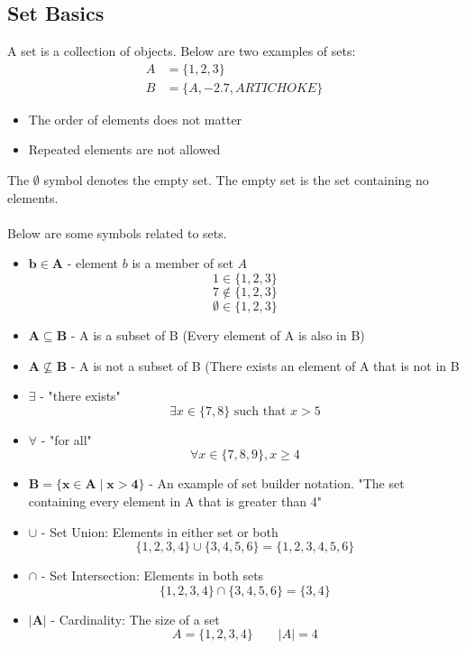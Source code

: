 \documentclass[12pt]{article}
\begin{document}
\subsection{Set Basics}

A set is a collection of objects. Below are two examples of sets:
\begin{align*}
	A &= \{1, 2, 3\} \\
	B &= \{A, -2.7, ARTICHOKE\}
\end{align*}
\begin{itemize}
	\item The order of elements does not matter
	\item Repeated elements are not allowed
\end{itemize}
The $\emptyset$ symbol denotes the empty set. The empty set is the set containing no elements.\\\\
Below are some symbols related to sets.
\begin{itemize}
	\item
		$\mathbf{b \in A}$ - element $b$ is a member of set $A$ \\
		$$1 \in \{1, 2, 3\}$$
		$$7 \not\in \{1, 2, 3\}$$
		$$\emptyset \in \{1, 2, 3\}$$
	\item
		$\mathbf{A \subseteq B}$ - A is a subset of B (Every element of A is also in B)
	\item
		$\mathbf{A \not\subseteq B}$ - A is not a subset of B (There exists an element of A that is not in B
	\item
		$\mathbf{\exists}$ - "there exists" \\
		$$\exists x \in \{7, 8\} \text{ such that } x > 5$$
	\item
		$\mathbf{\forall}$ - "for all" \\
		$$\forall x \in \{7, 8, 9\}, x \geq 4$$
	\item
		$\mathbf{B = \{x \in A \mid x > 4\}}$ - An example of set builder notation. "The set containing every element in A that is greater than 4"
	\item
		$\mathbf{\cup}$ - Set Union: Elements in either set or both\\
		$$ \{1, 2, 3, 4\} \cup \{3, 4, 5, 6\} = \{1, 2, 3, 4, 5, 6\} $$
	\item
		$\mathbf{\cap}$ - Set Intersection: Elements in both sets\\
		$$ \{1, 2, 3, 4\} \cap \{3, 4, 5, 6\} = \{3, 4\} $$
	\item
		$\mathbf{|A|}$ - Cardinality: The size of a set\\
		$$ A = \{1, 2, 3, 4\} \qquad |A| = 4$$
\end{itemize}
\end{document}
